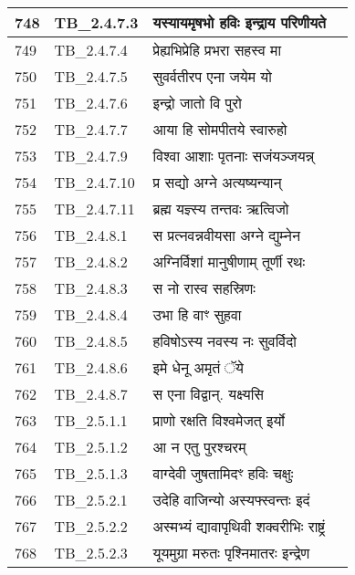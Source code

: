 \documentclass[17pt]{extarticle}
\begin{document}
\begin{longtable}{||p{0.4in}||p{0.9in}||p{4.0in}||p{0.9in}||}
        \hline
            748 & TB\_2.4.7.3 & यस्यायमृषभो हविः इन्द्राय परिणीयते &      \\
        \hline
            749 & TB\_2.4.7.4 & प्रेह्यभिप्रेहि प्रभरा सहस्व मा &      \\
        \hline
            750 & TB\_2.4.7.5 & सुवर्वतीरप एना जयेम यो &      \\
        \hline
            751 & TB\_2.4.7.6 & इन्द्रो जातो वि पुरो &      \\
        \hline
            752 & TB\_2.4.7.7 & आया हि सोमपीतये स्वारुहो &      \\
        \hline
            753 & TB\_2.4.7.9 & विश्वा आशाः पृतनाः सजंयञ्जयन्न् &      \\
        \hline
            754 & TB\_2.4.7.10 & प्र सद्यो अग्ने अत्यष्यन्यान् &      \\
        \hline
            755 & TB\_2.4.7.11 & ब्रह्म यज्ञ्स्य तन्तवः ऋत्विजो &      \\
        \hline
            756 & TB\_2.4.8.1 & स प्रत्नवन्नवीयसा अग्ने द्युम्नेन &      \\
        \hline
            757 & TB\_2.4.8.2 & अग्निर्विशां मानुषीणाम् तूर्णी रथः &      \\
        \hline
            758 & TB\_2.4.8.3 & स नो रास्व सहस्रिणः &      \\
        \hline
            759 & TB\_2.4.8.4 & उभा हि वाꣳ सुहवा &      \\
        \hline
            760 & TB\_2.4.8.5 & हविषोऽस्य नवस्य नः सुवर्विदो &      \\
        \hline
            761 & TB\_2.4.8.6 & इमे धेनू अमृतं ॅये &      \\
        \hline
            762 & TB\_2.4.8.7 & स एना विद्वान्. यक्ष्यसि &      \\
        \hline
            763 & TB\_2.5.1.1 & प्राणो रक्षति विश्वमेजत् इर्यो &      \\
        \hline
            764 & TB\_2.5.1.2 & आ न एतु पुरश्चरम् &      \\
        \hline
            765 & TB\_2.5.1.3 & वाग्देवी जुषतामिदꣳ हविः चक्षुः &      \\
        \hline
            766 & TB\_2.5.2.1 & उदेहि वाजिन्यो अस्यफ्स्वन्तः इदं &      \\
        \hline
            767 & TB\_2.5.2.2 & अस्मभ्यं द्यावापृथिवी शक्वरीभिः राष्ट्रं &      \\
        \hline
            768 & TB\_2.5.2.3 & यूयमुग्रा मरुतः पृश्निमातरः इन्द्रेण &      \\

\end{longtable}
\end{document}
